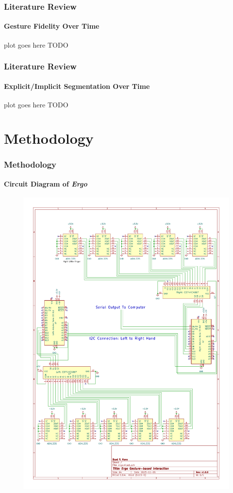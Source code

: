 \documentclass[xcolor={svgnames,table},10pt,fleqn]{beamer}
\begin{document}
\begin{frame}
    \frametitle{Literature Review}
    \framesubtitle{Gesture Fidelity Over Time}
    plot goes here
    TODO
\end{frame}

\begin{frame}
    \frametitle{Literature Review}
    \framesubtitle{Explicit/Implicit Segmentation Over Time}
    plot goes here
    TODO
\end{frame}

\section{Methodology}
\begin{frame}
    \frametitle{Methodology}
    \framesubtitle{Circuit Diagram of \emph{Ergo}}
    \begin{figure}[h]
        \centering
        \includegraphics[height=0.8\textheight]{imgs/ergo_schematic.pdf}
    \end{figure}
\end{frame}
\end{document}
